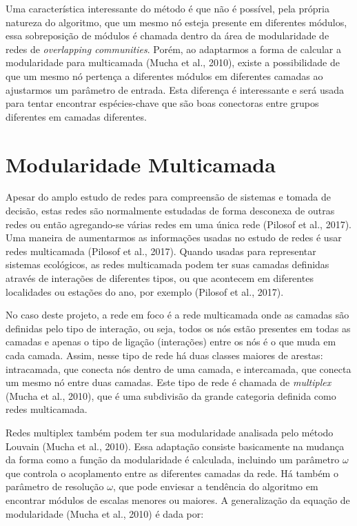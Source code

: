 \documentclass[
  12pt,
]{article}
\begin{document}
Uma característica interessante do método é que não é possível, pela
própria natureza do algoritmo, que um mesmo nó esteja presente em
diferentes módulos, essa sobreposição de módulos é chamada dentro da
área de modularidade de redes de \textit{overlapping communities}.
Porém, ao adaptarmos a forma de calcular a modularidade para multicamada
(Mucha et al., 2010), existe a possibilidade de que um mesmo nó pertença
a diferentes módulos em diferentes camadas ao ajustarmos um parâmetro de
entrada. Esta diferença é interessante e será usada para tentar
encontrar espécies-chave que são boas conectoras entre grupos diferentes
em camadas diferentes.

\pagebreak

\hypertarget{modularidade-multicamada}{%
\section{Modularidade Multicamada}\label{modularidade-multicamada}}

Apesar do amplo estudo de redes para compreensão de sistemas e tomada de
decisão, estas redes são normalmente estudadas de forma desconexa de
outras redes ou então agregando-se várias redes em uma única rede
(Pilosof et al., 2017). Uma maneira de aumentarmos as informações usadas
no estudo de redes é usar redes multicamada (Pilosof et al., 2017).
Quando usadas para representar sistemas ecológicos, as redes multicamada
podem ter suas camadas definidas através de interações de diferentes
tipos, ou que acontecem em diferentes localidades ou estações do ano,
por exemplo (Pilosof et al., 2017).

No caso deste projeto, a rede em foco é a rede multicamada onde as
camadas são definidas pelo tipo de interação, ou seja, todos os nós
estão presentes em todas as camadas e apenas o tipo de ligação
(interações) entre os nós é o que muda em cada camada. Assim, nesse tipo
de rede há duas classes maiores de arestas: intracamada, que conecta nós
dentro de uma camada, e intercamada, que conecta um mesmo nó entre duas
camadas. Este tipo de rede é chamada de \textit{multiplex} (Mucha et
al., 2010), que é uma subdivisão da grande categoria definida como redes
multicamada.

Redes multiplex também podem ter sua modularidade analisada pelo método
Louvain (Mucha et al., 2010). Essa adaptação consiste basicamente na
mudança da forma como a função da modularidade é calculada, incluindo um
parâmetro \(\omega\) que controla o acoplamento entre as diferentes
camadas da rede. Há também o parâmetro de resolução \(\omega\), que pode
enviesar a tendência do algoritmo em encontrar módulos de escalas
menores ou maiores. A generalização da equação de modularidade (Mucha et
al., 2010) é dada por:
\end{document}
